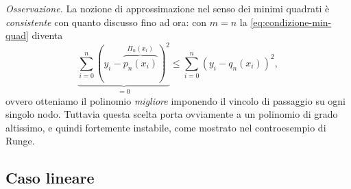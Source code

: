 \textit{Osservazione.}
La nozione di approssimazione nel senso dei minimi quadrati è \textit{consistente} con quanto discusso fino ad ora: con $m=n$ la \eqref{eq:condizione-min-quad} diventa
\begin{equation*}
\underbrace{\sum ^{n}_{i=0}( y_{i} -\overbrace{p_{n}( x_{i})}^{\Pi _{n}( x_{i})})^{2}}_{=0} \leqslant \sum ^{n}_{i=0}( y_{i} -q_{n}( x_{i}))^{2},
\end{equation*}
ovvero otteniamo il polinomio \textit{migliore} imponendo il vincolo di passaggio su ogni singolo nodo.
Tuttavia questa scelta porta ovviamente a un polinomio di grado altissimo, e quindi fortemente instabile, come mostrato nel controesempio di Runge.
\subsection{Caso lineare}

